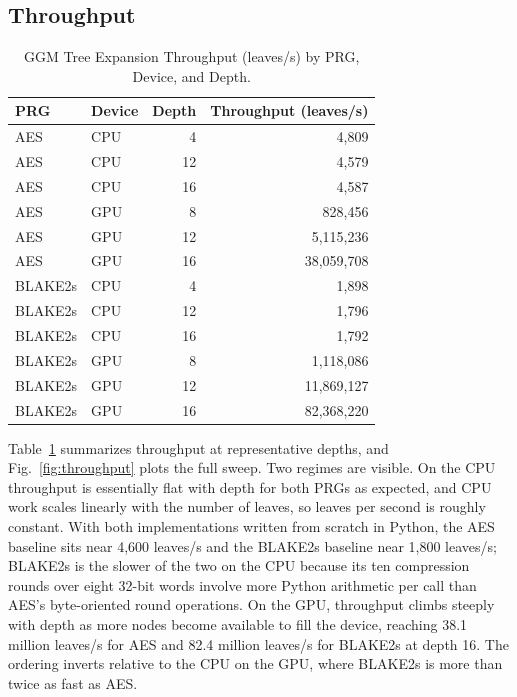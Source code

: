 \documentclass[conference]{IEEEtran}
\begin{document}
\subsection{Throughput}
\label{sec:throughput}

\begin{table}[H]
\centering
\caption{GGM Tree Expansion Throughput (leaves/s) by PRG, Device, and Depth.}
\label{tab:throughput}
\small
\begin{tabular}{llrr}
\toprule
PRG & Device & Depth & Throughput (leaves/s) \\
\midrule
AES     & CPU & 4  & 4{,}809 \\
AES     & CPU & 12 & 4{,}579 \\
AES     & CPU & 16 & 4{,}587 \\
AES     & GPU & 8  & 828{,}456 \\
AES     & GPU & 12 & 5{,}115{,}236 \\
AES     & GPU & 16 & 38{,}059{,}708 \\
BLAKE2s & CPU & 4  & 1{,}898 \\
BLAKE2s & CPU & 12 & 1{,}796 \\
BLAKE2s & CPU & 16 & 1{,}792 \\
BLAKE2s & GPU & 8  & 1{,}118{,}086 \\
BLAKE2s & GPU & 12 & 11{,}869{,}127 \\
BLAKE2s & GPU & 16 & 82{,}368{,}220 \\
\bottomrule
\end{tabular}
\end{table}

Table~\ref{tab:throughput} summarizes throughput at representative depths, and Fig.~\ref{fig:throughput} plots the full sweep. Two regimes are visible. On the CPU throughput is essentially flat with depth for both PRGs as expected, and CPU work scales linearly with the number of leaves, so leaves per second is roughly constant. With both implementations written from scratch in Python, the AES baseline sits near 4,600 leaves/s and the BLAKE2s baseline near 1,800 leaves/s; BLAKE2s is the slower of the two on the CPU because its ten compression rounds over eight 32-bit words involve more Python arithmetic per call than AES's byte-oriented round operations. On the GPU, throughput climbs steeply with depth as more nodes become available to fill the device, reaching 38.1 million leaves/s for AES and 82.4 million leaves/s for BLAKE2s at depth 16. The ordering inverts relative to the CPU on the GPU, where BLAKE2s is more than twice as fast as AES.
\end{document}
